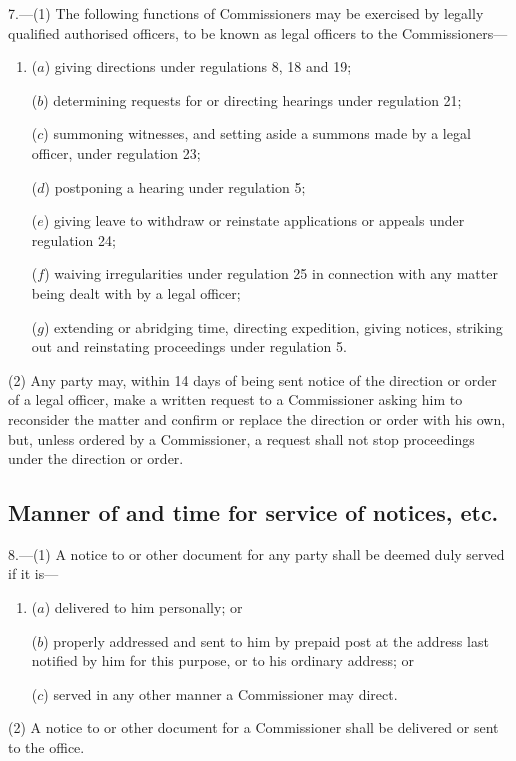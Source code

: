 \documentclass[12pt,a4paper]{article}
\begin{document}
7.—(1) The following functions of Commissioners may be exercised by legally qualified authorised officers, to be known as legal officers to the Commissioners—
\begin{enumerate}\item[]
($a$) giving directions under regulations 8, 18 and 19;

($b$) determining requests for or directing hearings under regulation 21;

($c$) summoning witnesses, and setting aside a summons made by a legal officer, under regulation 23;

($d$) postponing a hearing under regulation 5;

($e$) giving leave to withdraw or reinstate applications or appeals under regulation 24;

($f$) waiving irregularities under regulation 25 in connection with any matter being dealt with by a legal officer;

($g$) extending or abridging time, directing expedition, giving notices, striking out and reinstating proceedings under regulation 5.
\end{enumerate}

(2) Any party may, within 14 days of being sent notice of the direction or order of a legal officer, make a written request to a Commissioner asking him to reconsider the matter and confirm or replace the direction or order with his own, but, unless ordered by a Commissioner, a request shall not stop proceedings under the direction or order.

\subsection[8. Manner of and time for service of notices, etc.]{Manner of and time for service of notices, etc.}

8.—(1) A notice to or other document for any party shall be deemed duly served if it is---
\begin{enumerate}\item[]
($a$) delivered to him personally; or

($b$) properly addressed and sent to him by prepaid post at the address last notified by him for this purpose, or to his ordinary address; or

($c$) served in any other manner a Commissioner may direct.
\end{enumerate}

(2) A notice to or other document for a Commissioner shall be delivered or sent to the office.
\end{document}
